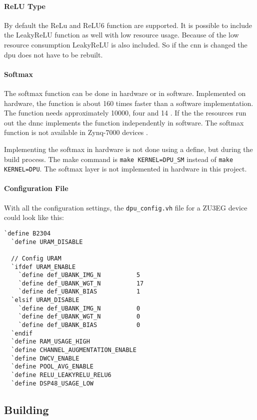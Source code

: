 \paragraph{ReLU Type}
By default the ReLu and ReLU6 function are supported.
It is possible to include the LeakyReLU function as well with low resource usage.
Because of the low resource consumption LeakyReLU is also included.
So if the \acrshort{cnn} is changed the \acrshort{dpu} does not have to be rebuilt. 

\paragraph{Softmax}
The softmax function can be done in hardware or in software.
Implemented on hardware, the function is about 160 times faster than a software implementation.
The function needs approximately \SI{10000}{}, four  and 14 .
If the the resources run out the \acrlong{dnnc} implements the function independently in software.
The softmax function is not available in Zynq-7000 devices \cite{dpu_product_guide}. 

Implementing the softmax in hardware is not done using a define, but during the build process.
The make command is \texttt{make KERNEL=DPU\_SM} instead of \texttt{make KERNEL=DPU}.
The softmax layer is not implemented in hardware in this project.

\paragraph{Configuration File}
With all the configuration settings, the \texttt{dpu\_config.vh} file for a ZU3EG device could look like this:

\begin{lstlisting}[style=bash, caption={Configure \acrshort{dpu}}, label=lst:config_dpu]
  `define B2304
  `define URAM_DISABLE 

  // Config URAM
  `ifdef URAM_ENABLE
    `define def_UBANK_IMG_N          5
    `define def_UBANK_WGT_N          17
    `define def_UBANK_BIAS           1
  `elsif URAM_DISABLE
    `define def_UBANK_IMG_N          0
    `define def_UBANK_WGT_N          0
    `define def_UBANK_BIAS           0
  `endif
  `define RAM_USAGE_HIGH
  `define CHANNEL_AUGMENTATION_ENABLE
  `define DWCV_ENABLE
  `define POOL_AVG_ENABLE
  `define RELU_LEAKYRELU_RELU6
  `define DSP48_USAGE_LOW
\end{lstlisting}

\subsection{Building}
\label{subsec:embedded_platform:dpu:building}

